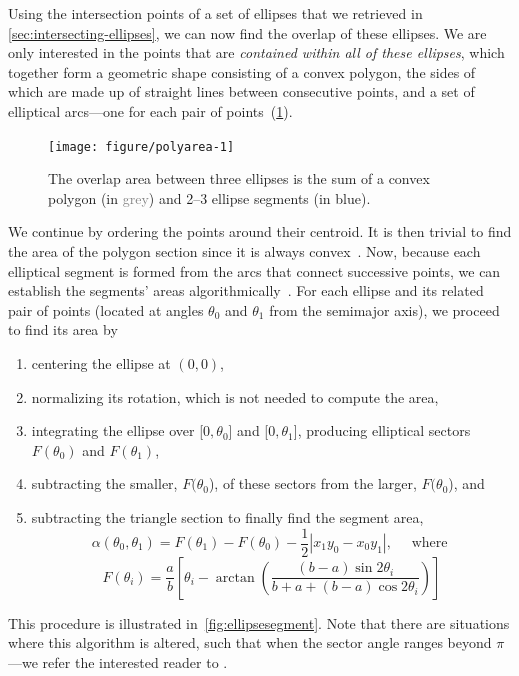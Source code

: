 \documentclass[
  oneside,
  openany,
  numbers=noendperiod,
  parskip=half,
  bibliography=totoc
]{scrbook}\usepackage[]{graphicx}\usepackage{xcolor}
\newenvironment{knitrout}{}{} %
\begin{document}
Using the intersection points of a set of ellipses that we retrieved in
\cref{sec:intersecting-ellipses}, we can now find the
overlap of these ellipses. We are only interested in the points that are \emph{contained
within all of these ellipses}, which together form a geometric shape consisting of a
convex polygon, the sides of which are made up of straight lines between
consecutive points, and a set of elliptical arcs---one for each
pair of points~(\cref{fig:polyarea}).

\begin{figure}[hbtp]
\caption{The overlap area between three ellipses is the sum of a convex
polygon (in \textcolor{Grey}{grey}) and 2--3 ellipse segments (in
\textcolor{SteelBlue4}{blue}).\label{fig:polyarea}}
\begin{knitrout}\small
{}\color{fgcolor}

{\centering \texttt{[image: figure/polyarea-1]} 

}



\end{knitrout}
\end{figure}

We continue by ordering the points around their centroid. It is then trivial to
find the area of the
polygon section since it is always convex~\citep{Finley_2006}. Now, because each
elliptical segment is formed from the arcs that connect successive
points, we can establish the segments' areas algorithmically~\citep{Eberly_2016}.
For each ellipse and its related pair of points (located at angles $\theta_0$ and
$\theta_1$ from the semimajor axis), we proceed to find its area by
\begin{enumerate}
\item centering the ellipse at $(0, 0)$,
\item normalizing its rotation, which is not needed to compute the area,
\item integrating the ellipse over [$0,\theta_0$] and [$0,\theta_1$], producing
  elliptical sectors $F(\theta_0)$ and $F(\theta_1)$,
\item subtracting the smaller, $F(\theta_0$), of these sectors from the larger, $F(\theta_0$), and
\item subtracting the triangle section to finally find the segment area,
  \begin{equation*}
  \alpha(\theta_0,\theta_1) = F(\theta_1) - F(\theta_0) - \frac{1}{2}\left|x_1y_0 - x_0y_1\right|,\quad\text{ where }
  \label{eq:segmentArea}
  \end{equation*}
  \begin{equation*}
  F(\theta_i) =  \frac{a}{b}\left[ \theta_i - \arctan{\left(\frac{(b - a)\sin{2\theta_i}}{b + a +(b - a )\cos{2\theta_i}} \right)}\right]
  \end{equation*}
\end{enumerate}
This procedure is illustrated in~\cref{fig:ellipsesegment}. Note that there are
situations where this algorithm is altered, such that when the sector angle
ranges beyond $\pi$---we refer the interested reader to \citet{Eberly_2016}.
\end{document}
